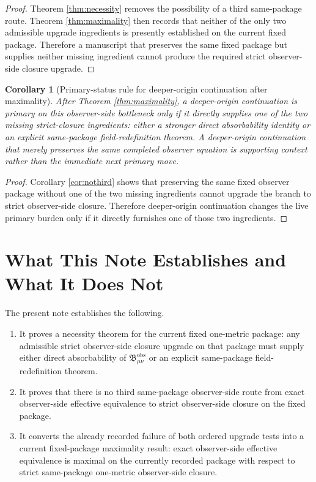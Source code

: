\documentclass[11pt]{article}
\newcommand{\ObsBurden}{\mathfrak B_{\mu\nu}^{\mathrm{obs}}}
\newtheorem{corollary}{Corollary}
\begin{document}
\begin{proof}
Theorem \ref{thm:necessity} removes the possibility of a third same-package route. Theorem \ref{thm:maximality} then records that neither of the only two admissible upgrade ingredients is presently established on the current fixed package. Therefore a manuscript that preserves the same fixed package but supplies neither missing ingredient cannot produce the required strict observer-side closure upgrade.
\end{proof}

\begin{corollary}[Primary-status rule for deeper-origin continuation after maximality]
\label{cor:depth}
After Theorem \ref{thm:maximality}, a deeper-origin continuation is primary on this observer-side bottleneck only if it directly supplies one of the two missing strict-closure ingredients: either a stronger direct absorbability identity or an explicit same-package field-redefinition theorem. A deeper-origin continuation that merely preserves the same completed observer equation is supporting context rather than the immediate next primary move.
\end{corollary}

\begin{proof}
Corollary \ref{cor:nothird} shows that preserving the same fixed observer package without one of the two missing ingredients cannot upgrade the branch to strict observer-side closure. Therefore deeper-origin continuation changes the live primary burden only if it directly furnishes one of those two ingredients.
\end{proof}

\section{What This Note Establishes and What It Does Not}

The present note establishes the following.
\begin{enumerate}
    \item It proves a necessity theorem for the current fixed one-metric package: any admissible strict observer-side closure upgrade on that package must supply either direct absorbability of \(\ObsBurden\) or an explicit same-package field-redefinition theorem.
    \item It proves that there is no third same-package observer-side route from exact observer-side effective equivalence to strict observer-side closure on the fixed package.
    \item It converts the already recorded failure of both ordered upgrade tests into a current fixed-package maximality result: exact observer-side effective equivalence is maximal on the currently recorded package with respect to strict same-package one-metric observer-side closure.
\end{enumerate}
\end{document}
